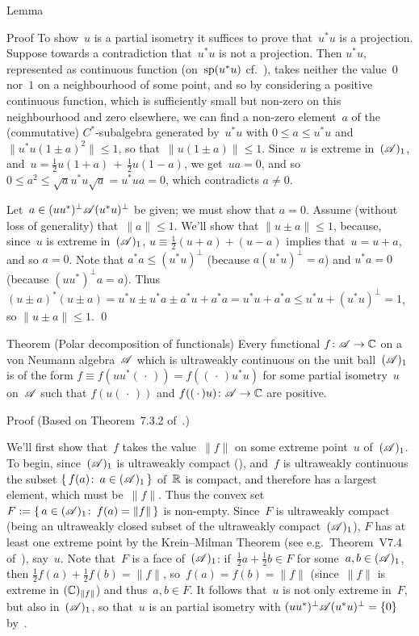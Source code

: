 \documentclass[a]{subfiles}
\begin{document}
\begin{parsec}
\begin{point}{Lemma}
\begin{point}{Proof}
To show~$u$ is a partial isometry
it suffices to prove that~$u^*u$ is a projection.
Suppose towards a contradiction that~$u^*u$ is not a projection.
Then $u^*u$,
represented
as continuous function (on~$\mathrm{sp}(u^*u)$ cf.~),
takes neither the value~$0$ nor~$1$ on a neighbourhood
of some point,
and so by considering a
positive continuous function,
which is sufficiently small but non-zero on this neighbourhood
and zero elsewhere, 
we can find a non-zero element~$a$ 
of the (commutative) $C^*$-subalgebra generated by~$u^*u$
with $0\leq a\leq u^*u$
and $\|u^*u (1\pm a)^2\|\leq 1$,
so that~$\|u(1\pm a)\|\leq 1$.
Since~$u$ is extreme in~$(\mathscr{A})_1$,
and~$u=\frac{1}{2}u(1+a)\,+\,\frac{1}{2}u(1-a)$,
we get~$ua=0$,
and so $0\leq a^2\leq \sqrt{a}u^*u\sqrt{a}=u^*ua=0$,
which contradicts $a\neq 0$.

Let~$a\in (uu^*)^\perp \mathscr{A} (u^*u)^\perp$
be given; we must show that $a=0$.
Assume (without loss of generality)
that~$\|a\|\leq 1$.
We'll show that $\|u\pm a\|\leq 1$,
because,
since~$u$ is extreme in~$(\mathscr{A})_1$,
$u\equiv \frac{1}{2}(u+a)+(u-a)$
implies that~$u=u+a$, and so $a=0$.
Note that $a^*a \leq (u^*u)^\perp$ (because $a(u^*u)^\perp=a$)
and $u^*a = 0$ (because $(uu^*)^\perp a=a$).
Thus $(u\pm a)^*(u\pm a)
=u^*u \pm u^* a \pm a^* u + a^*a
= u^*u + a^*a \leq u^*u + (u^*u)^\perp = 1$,
so $\|u\pm a\|\leq 1$. \qed
\end{point}
\end{point}
\begin{point}%
	{Theorem (Polar decomposition of functionals)}%
Every functional $f\colon \mathscr{A}\to \mathbb{C}$ on a von Neumann algebra~$\mathscr{A}$
which is ultraweakly continuous on
the unit ball~$(\mathscr{A})_1$
is of the form $f\equiv f(uu^*(\,\cdot\,)) = f((\,\cdot\,)u^*u)$
for some partial isometry~$u$ on~$\mathscr{A}$
such that $f(u(\,\cdot\,))$
and $f((\,\cdot\,)u)\colon \mathscr{A}\to\mathbb{C}$
are positive.
\begin{point}{Proof}%
(Based on Theorem~7.3.2 of~\cite{kr}.) 
\begin{point}%
We'll first show that~$f$ takes the value~$\|f\|$
on some extreme point~$u$ of~$(\mathscr{A})_1$.
To begin, since~$(\mathscr{A})_1$ is ultraweakly compact (),
and~$f$ is ultraweakly continuous
the subset $\{\,f(a)\colon\,a\in(\mathscr{A})_1\,\}$
of~$\mathbb{R}$ is compact,
and therefore has a largest element, 
which must be~$\|f\|$.
Thus the convex
set~$F:=\{\,a\in(\mathscr{A})_1\colon\, f(a)=\|f\|\,\}$
is non-empty.
Since~$F$ is ultraweakly compact (being an ultraweakly closed
subset of the ultraweakly compact~$(\mathscr{A})_1$),
$F$ has at least one extreme point
by the Krein--Milman Theorem
(see e.g.~Theorem~V7.4 of~\cite{conway2013}), say~$u$.
Note that~$F$ is a face of~$(\mathscr{A})_1$:
if~$\frac{1}{2}a+\frac{1}{2}b\in F$ for some~$a,b\in(\mathscr{A})_1$,
then $\frac{1}{2}f(a)+\frac{1}{2}f(b) = \|f\|$,
so~$f(a)=f(b)=\|f\|$
(since~$\|f\|$ is extreme in $(\mathbb{C})_{\|f\|}$)
and thus~$a,b\in F$.
It follows that~$u$ is not only extreme in~$F$, but also in~$(\mathscr{A})_1$,
so that~$u$ is an partial isometry with $(uu^*)^\perp\mathscr{A}(u^*u)^\perp=\{0\}$
by~.


\end{point}
\end{point}
\end{point}
\end{parsec}
\end{document}
